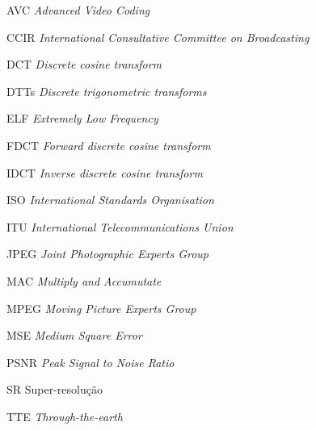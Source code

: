 \begin{siglas}
  \item[AVC] \textit{Advanced Video Coding}
  \item[CCIR] \textit{International Consultative Committee on Broadcasting}
  \item[DCT] \textit{Discrete cosine transform}
  \item[DTTs] \textit{Discrete trigonometric transforms}
  \item[ELF] \textit{Extremely Low Frequency}
  \item[FDCT] \textit{Forward discrete cosine transform} 
  \item[IDCT] \textit{Inverse discrete cosine transform}
  \item[ISO] \textit{International Standards Organisation} 
  \item[ITU] \textit{International Telecommunications Union}
  \item[JPEG] \textit{Joint Photographic Experts Group}
  \item[MAC] \textit{Multiply and Accumutate}
  \item[MPEG] \textit{Moving Picture Experts Group}
  \item[MSE] \textit{Medium Square Error}
  \item[PSNR] \textit{Peak Signal to Noise Ratio}
  \item[SR] Super-resolução
  \item[TTE] \textit{Through-the-earth}
\end{siglas}

